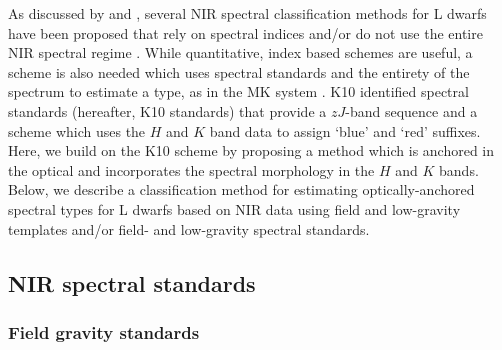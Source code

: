 \documentclass[12pt]{aastex6}
\begin{document}
As discussed by \citet[\S~3.2]{Kirkpatrick05} and \citet[hereafter K10]{Kirkpatrick10}, several NIR spectral classification methods for L dwarfs have been proposed that rely on spectral indices and/or do not use the entire NIR spectral regime \citep[e.g.,][]{Geballe02,Allers:2013hk}.
While quantitative, index based schemes are useful, a scheme is also needed which uses spectral standards and the entirety of the spectrum to estimate a type, as in the MK system \citep{Morgan:1984wy}.
K10 identified spectral standards (hereafter, K10 standards) that provide a $zJ$-band sequence and a scheme which uses the $H$ and $K$ band data to assign `blue' and `red' suffixes.
Here, we build on the K10 scheme by proposing a method which is anchored in the optical and incorporates the spectral morphology in the $H$ and $K$ bands.
Below, we describe a classification method for estimating optically-anchored spectral types for L dwarfs based on NIR data using field and low-gravity templates and/or field- and low-gravity spectral standards.

\subsection{NIR spectral standards}
\subsubsection{Field gravity standards}
\label{sec:field_stds}
\end{document}
